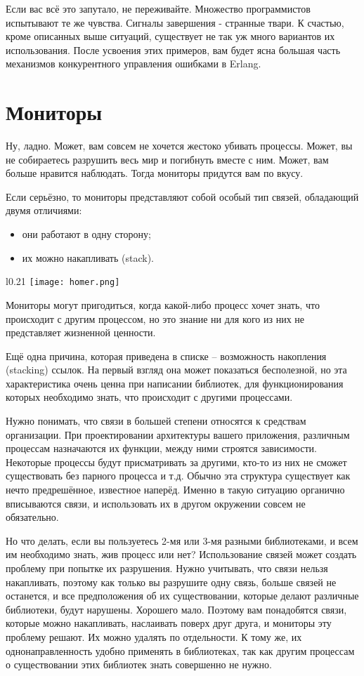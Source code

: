 Если вас всё это запутало, не переживайте.
Множество программистов испытывают те же чувства.
Сигналы завершения \-- странные твари.
К счастью, кроме описанных выше ситуаций, существует не так уж много вариантов их использования.
После усвоения этих примеров, вам будет ясна большая часть механизмов конкурентного управления ошибками в Erlang.
\section{Мониторы}
\label{monitors}
Ну, ладно.
Может, вам совсем не хочется жестоко убивать процессы.
Может, вы не собираетесь разрушить весь мир и погибнуть вместе с ним.
Может, вам больше нравится наблюдать.
Тогда мониторы придутся вам по вкусу.

Если серьёзно, то мониторы представляют собой особый тип связей, обладающий двумя отличиями:
\begin{itemize}
    \item они работают в одну сторону;
    \item их можно накапливать (stack).
\end{itemize}

\begin{wrapfigure}{l}{0.21\linewidth}
    \texttt{[image: homer.png]}
\end{wrapfigure}

Мониторы могут пригодиться, когда какой\--либо процесс хочет знать, что происходит с другим  процессом, но это знание ни для кого из них не представляет жизненной ценности.

Ещё одна причина, которая приведена в списке \--- возможность накопления (stacking) ссылок.
На первый взгляд она может показаться бесполезной, но эта характеристика очень ценна при написании библиотек, для функционирования которых необходимо знать, что происходит с другими процессами.

Нужно понимать, что связи в большей степени относятся к средствам организации.
При проектировании архитектуры вашего приложения, различным процессам назначаются их функции, между ними строятся зависимости.
Некоторые процессы будут присматривать за другими, кто\--то из них не сможет существовать без парного процесса и т.д.
Обычно эта структура существует как нечто предрешённое, известное наперёд.
Именно в такую ситуацию органично вписываются связи, и использовать их в другом окружении совсем не обязательно.

Но что делать, если вы пользуетесь 2\--мя или 3\--мя разными библиотеками, и всем им необходимо знать, жив процесс или нет?
Использование связей может создать проблему при попытке их разрушения.
Нужно учитывать, что связи нельзя накапливать, поэтому как только вы разрушите одну связь, больше связей не останется, и все предположения об их существовании, которые делают различные библиотеки, будут нарушены.
Хорошего мало.
Поэтому вам понадобятся связи, которые можно накапливать, наслаивать поверх друг друга, и мониторы эту проблему решают.
Их можно удалять по отдельности.
К тому же, их однонаправленность удобно применять в библиотеках, так как другим процессам о существовании этих библиотек знать совершенно не нужно.

